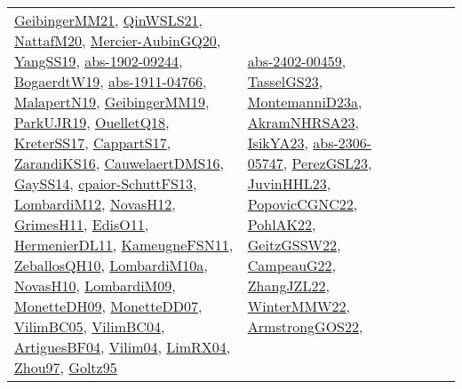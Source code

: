 {\begin{longtable}{lp{3cm}>{\raggedright}p{6cm}>{\raggedright}p{6cm}p{8cm}}
\href{papers/GeibingerMM21.pdf}{GeibingerMM21}\cite{GeibingerMM21}, \href{articles/QinWSLS21.pdf}{QinWSLS21}\cite{QinWSLS21}, \href{papers/NattafM20.pdf}{NattafM20}\cite{NattafM20}, \href{papers/Mercier-AubinGQ20.pdf}{Mercier-AubinGQ20}\cite{Mercier-AubinGQ20}, \href{papers/YangSS19.pdf}{YangSS19}\cite{YangSS19}, \href{articles/abs-1902-09244.pdf}{abs-1902-09244}\cite{abs-1902-09244}, \href{papers/BogaerdtW19.pdf}{BogaerdtW19}\cite{BogaerdtW19}, \href{articles/abs-1911-04766.pdf}{abs-1911-04766}\cite{abs-1911-04766}, \href{papers/MalapertN19.pdf}{MalapertN19}\cite{MalapertN19}, \href{papers/GeibingerMM19.pdf}{GeibingerMM19}\cite{GeibingerMM19}, \href{papers/ParkUJR19.pdf}{ParkUJR19}\cite{ParkUJR19}, \href{papers/OuelletQ18.pdf}{OuelletQ18}\cite{OuelletQ18}, \href{articles/KreterSS17.pdf}{KreterSS17}\cite{KreterSS17}, \href{papers/CappartS17.pdf}{CappartS17}\cite{CappartS17}, \href{articles/ZarandiKS16.pdf}{ZarandiKS16}\cite{ZarandiKS16}, \href{papers/CauwelaertDMS16.pdf}{CauwelaertDMS16}\cite{CauwelaertDMS16}, \href{papers/GaySS14.pdf}{GaySS14}\cite{GaySS14}, \href{papers/cpaior-SchuttFS13.pdf}{cpaior-SchuttFS13}\cite{cpaior-SchuttFS13}, \href{articles/LombardiM12.pdf}{LombardiM12}\cite{LombardiM12}, \href{articles/NovasH12.pdf}{NovasH12}\cite{NovasH12}, \href{papers/GrimesH11.pdf}{GrimesH11}\cite{GrimesH11}, \href{papers/EdisO11.pdf}{EdisO11}\cite{EdisO11}, \href{papers/HermenierDL11.pdf}{HermenierDL11}\cite{HermenierDL11}, \href{papers/KameugneFSN11.pdf}{KameugneFSN11}\cite{KameugneFSN11}, \href{articles/ZeballosQH10.pdf}{ZeballosQH10}\cite{ZeballosQH10}, \href{articles/LombardiM10a.pdf}{LombardiM10a}\cite{LombardiM10a}, \href{articles/NovasH10.pdf}{NovasH10}\cite{NovasH10}, \href{papers/LombardiM09.pdf}{LombardiM09}\cite{LombardiM09}, \href{papers/MonetteDH09.pdf}{MonetteDH09}\cite{MonetteDH09}, \href{papers/MonetteDD07.pdf}{MonetteDD07}\cite{MonetteDD07}, \href{articles/VilimBC05.pdf}{VilimBC05}\cite{VilimBC05}, \href{papers/VilimBC04.pdf}{VilimBC04}\cite{VilimBC04}, \href{papers/ArtiguesBF04.pdf}{ArtiguesBF04}\cite{ArtiguesBF04}, \href{papers/Vilim04.pdf}{Vilim04}\cite{Vilim04}, \href{papers/LimRX04.pdf}{LimRX04}\cite{LimRX04}, \href{articles/Zhou97.pdf}{Zhou97}\cite{Zhou97}, \href{papers/Goltz95.pdf}{Goltz95}\cite{Goltz95} & \href{articles/abs-2402-00459.pdf}{abs-2402-00459}\cite{abs-2402-00459}, \href{papers/TasselGS23.pdf}{TasselGS23}\cite{TasselGS23}, \href{articles/MontemanniD23a.pdf}{MontemanniD23a}\cite{MontemanniD23a}, \href{articles/AkramNHRSA23.pdf}{AkramNHRSA23}\cite{AkramNHRSA23}, \href{articles/IsikYA23.pdf}{IsikYA23}\cite{IsikYA23}, \href{articles/abs-2306-05747.pdf}{abs-2306-05747}\cite{abs-2306-05747}, \href{papers/PerezGSL23.pdf}{PerezGSL23}\cite{PerezGSL23}, \href{papers/JuvinHHL23.pdf}{JuvinHHL23}\cite{JuvinHHL23}, \href{papers/PopovicCGNC22.pdf}{PopovicCGNC22}\cite{PopovicCGNC22}, \href{articles/PohlAK22.pdf}{PohlAK22}\cite{PohlAK22}, \href{papers/GeitzGSSW22.pdf}{GeitzGSSW22}\cite{GeitzGSSW22}, \href{articles/CampeauG22.pdf}{CampeauG22}\cite{CampeauG22}, \href{papers/ZhangJZL22.pdf}{ZhangJZL22}\cite{ZhangJZL22}, \href{papers/WinterMMW22.pdf}{WinterMMW22}\cite{WinterMMW22}, \href{papers/ArmstrongGOS22.pdf}{ArmstrongGOS22}\cite{ArmstrongGOS22}, 
\end{longtable}}
